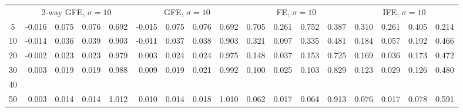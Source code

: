 \documentclass{article}
\begin{document}
\begin{tabular}{c r r r r r r r r r r r r r r r r}
 & \multicolumn{ 4 }{c}{ 2-way GFE, $\sigma{=}1$0} & \multicolumn{ 4 }{c}{ GFE, $\sigma{=}1$0} & \multicolumn{ 4 }{c}{ FE, $\sigma{=}1$0} & \multicolumn{ 4 }{c}{ IFE, $\sigma{=}1$0}\\[-3pt]
 \cmidrule(lr){2-5}  \cmidrule(lr){6-9}  \cmidrule(lr){10-13}  \cmidrule(lr){14-17}
5 &     -0.016 &      0.075 &      0.076 &      0.692 &     -0.015 &      0.075 &      0.076 &      0.692 &      0.705 &      0.261 &      0.752 &      0.387 &      0.310 &      0.261 &      0.405 &      0.214\\
10 &     -0.014 &      0.036 &      0.039 &      0.903 &     -0.011 &      0.037 &      0.038 &      0.903 &      0.321 &      0.097 &      0.335 &      0.481 &      0.184 &      0.057 &      0.192 &      0.466\\
20 &     -0.002 &      0.023 &      0.023 &      0.979 &      0.003 &      0.024 &      0.024 &      0.975 &      0.148 &      0.037 &      0.153 &      0.725 &      0.169 &      0.036 &      0.173 &      0.472\\
30 &      0.003 &      0.019 &      0.019 &      0.988 &      0.009 &      0.019 &      0.021 &      0.992 &      0.100 &      0.025 &      0.103 &      0.829 &      0.123 &      0.029 &      0.126 &      0.480\\
40\\
50 &      0.003 &      0.014 &      0.014 &      1.012 &      0.010 &      0.014 &      0.018 &      1.010 &      0.062 &      0.017 &      0.064 &      0.913 &      0.076 &      0.017 &      0.078 &      0.591\\[0pt]
\bottomrule 
\end{tabular}
\end{document}
